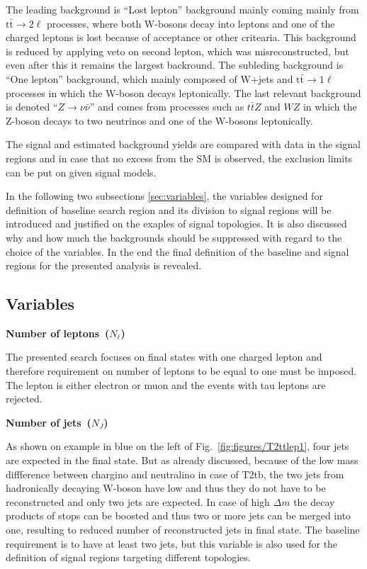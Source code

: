 The leading background is ``Lost lepton'' background mainly coming mainly from $\mathrm{t\bar{t}} \to 2 \ell$ processes, where both W-bosons decay into leptons and one of the charged leptons is lost because of acceptance or other critearia. This background is reduced by applying veto on second lepton, which was misreconstructed, but even after this it remains the largest backround. The subleding background is ``One lepton'' background, which mainly composed of W+jets and $\mathrm{t\bar{t}} \to 1 \ell$ processes in which the W-boson decays leptonically. The last relevant background is denoted ``$Z \to \nu \bar{\nu}$'' and comes from processes such as $t\bar{t}Z$ and $WZ$ in which the Z-boson decays to two neutrinos and one of the W-bosons leptonically.  

The signal and estimated background yields are compared with data in the signal regions and in case that no excess from the SM is observed, the exclusion limits can be put on given signal models.

In the following two subsections \ref{sec:variables}, the variables designed for definition of baseline search region and its division to signal regions will be introduced and justified on the exaples of signal topologies.  It is also discussed why and how much the backgrounds should be suppressed with regard to the choice of the variables. In the end the final definition of the baseline and signal regions for the presented analysis is revealed.


\subsection{Variables~\label{sec:variables}}

\textbf{Number of leptons~($N_{\ell}$)}

The presented search focuses on final states with one charged lepton and therefore requirement on number of leptons to be equal to one must be imposed. The lepton is either electron or muon and the events with tau leptons are rejected.

\textbf{Number of jets~($N_{J}$)}

As shown on example in blue on the left of Fig.~\ref{fig:figures/T2ttlep1}, four jets are expected in the final state. But as already discussed, because of the low mass diffference between chargino and neutralino in case of T2tb, the two jets from hadronically decaying W-boson have low \pt and thus they do not have to be reconstructed and only two jets are expected. In case of high $\Delta m$ the decay products of stops can be boosted and thus two or more jets can be merged into one, resulting to reduced number of reconstructed jets in final state. The baseline requirement is to have at least two jets, but this variable is also used for the definition of signal regions targeting different topologies.

